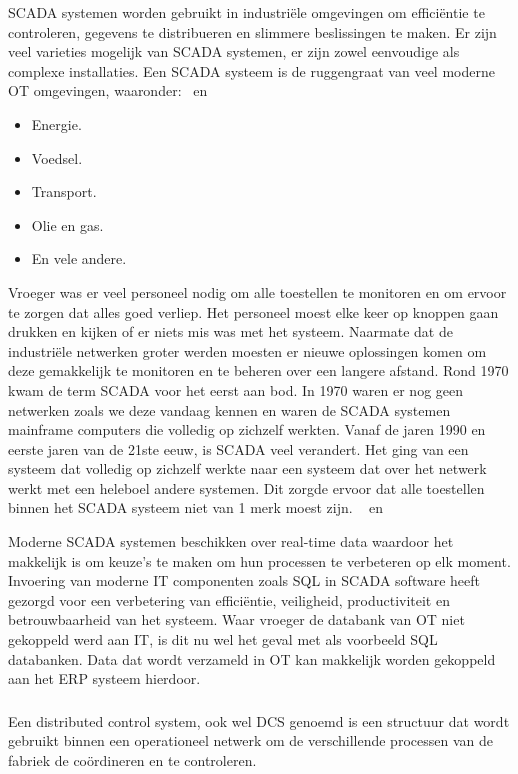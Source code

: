 SCADA systemen worden gebruikt in industriële omgevingen om efficiëntie te controleren, gegevens te distribueren en slimmere beslissingen te maken. Er zijn veel varieties mogelijk van SCADA systemen, er zijn zowel eenvoudige als complexe installaties. Een SCADA systeem is de ruggengraat van veel moderne OT omgevingen, waaronder:~\autocite{Muthukrishnan2021} en ~\autocite{2018a}
\begin{itemize}
    \item Energie.
    \item Voedsel.
    \item Transport.
    \item Olie en gas.
    \item En vele andere.
\end{itemize}

Vroeger was er veel personeel nodig om alle toestellen te monitoren en om ervoor te zorgen dat alles goed verliep. Het personeel moest elke keer op knoppen gaan drukken en kijken of er niets mis was met het systeem. Naarmate dat de industriële netwerken groter werden moesten er nieuwe oplossingen komen om deze gemakkelijk te monitoren en te beheren over een langere afstand. Rond 1970 kwam de term SCADA voor het eerst aan bod. In 1970 waren er nog geen netwerken zoals we deze vandaag kennen en waren de SCADA systemen mainframe computers die volledig op zichzelf werkten. Vanaf de jaren 1990 en eerste jaren van de 21ste eeuw, is SCADA veel verandert. Het ging van een systeem dat volledig op zichzelf werkte naar een systeem dat over het netwerk werkt met een heleboel andere systemen. Dit zorgde ervoor dat alle toestellen binnen het SCADA systeem niet van 1 merk moest zijn. ~\autocite{Muthukrishnan2021} en ~\autocite{2018a}

Moderne SCADA systemen beschikken over real-time data waardoor het makkelijk is om keuze's te maken om hun processen te verbeteren op elk moment. Invoering van moderne IT componenten zoals SQL in SCADA software heeft gezorgd voor een verbetering van efficiëntie, veiligheid, productiviteit en betrouwbaarheid van het systeem. Waar vroeger de databank van OT niet gekoppeld werd aan IT, is dit nu wel het geval met als voorbeeld SQL databanken. Data dat wordt verzameld in OT kan makkelijk worden gekoppeld aan het ERP systeem hierdoor.~\autocite{2018a}

\subsubsection{}
\label{subsubsec:DCS}
Een distributed control system, ook wel DCS genoemd is een structuur dat wordt gebruikt binnen een operationeel netwerk om de verschillende processen van de fabriek de coördineren en te controleren.~\autocite{Realpars2019} 

